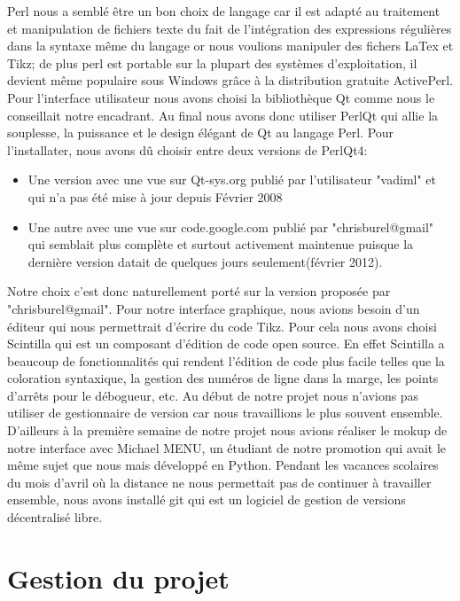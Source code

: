 \documentclass[a4paper]{report}
\begin{document}
Perl nous a semblé être un bon choix de langage car il est adapté au traitement et manipulation de fichiers texte du fait de l'intégration des expressions régulières dans la syntaxe même du langage or nous voulions manipuler des fichers LaTex et Tikz; de plus perl est portable sur la plupart des systèmes d'exploitation, il devient même populaire sous Windows grâce à la distribution gratuite ActivePerl. 
Pour l'interface utilisateur nous avons choisi la bibliothèque Qt comme nous le conseillait notre encadrant. Au final nous avons donc utiliser PerlQt qui allie la souplesse, la puissance et le design élégant de Qt au langage Perl. Pour l'installater, nous avons dû choisir entre deux versions de PerlQt4:
\begin{itemize}
 \item Une version avec une vue sur Qt-sys.org publié par l'utilisateur "vadiml" et qui n'a pas été mise à jour depuis Février 2008
 \item Une autre avec une vue sur code.google.com publié par "chrisburel@gmail" qui semblait plus complète et surtout activement maintenue puisque la dernière version datait de quelques jours seulement(février 2012).
\end{itemize}
  Notre choix c'est donc naturellement porté sur la version proposée par "chrisburel@gmail".
  \newline 
  Pour notre interface graphique, nous avions besoin d'un éditeur qui nous permettrait d'écrire du code Tikz. Pour cela nous avons choisi Scintilla qui est un composant d'édition de code open source. En effet Scintilla a beaucoup de fonctionnalités qui rendent l'édition de code plus facile telles que la coloration syntaxique, la gestion des numéros de ligne dans la marge, les points d'arrêts pour le débogueur, etc.
  \newline
  Au début de notre projet nous n'avions pas utiliser de gestionnaire de version car nous travaillions le plus souvent ensemble. D'ailleurs à la première semaine de notre projet nous avions réaliser le mokup de notre interface avec Michael MENU, un étudiant de notre promotion qui avait le même sujet que nous mais développé en Python. Pendant les vacances scolaires du mois d'avril où la distance ne nous permettait pas de continuer à travailler ensemble, nous avons installé git qui est un logiciel de gestion de versions décentralisé libre. 
  
\chapter {Gestion du projet}
\end{document}
